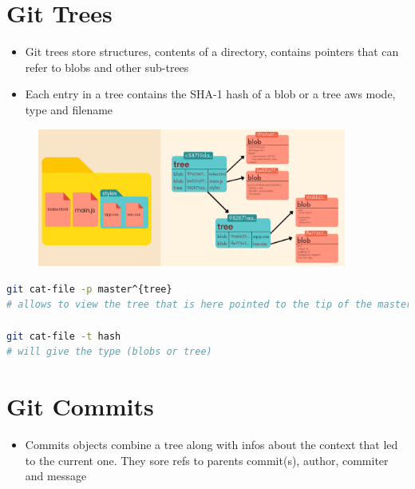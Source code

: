 \documentclass{report}
\begin{document}
\section{Git Trees}

\begin{itemize}
	\item Git trees store structures, contents of a directory, contains pointers that can refer to blobs and other sub-trees 
	\item Each entry in a tree contains the SHA-1 hash of a blob or a tree aws mode, type and filename
\end{itemize}

\begin{figure}[H] 
	 \centering 
	 \includegraphics[width=4in]{screenshots/2022-07-10T17-18-43Z.png} 
\end{figure}

\begin{tcolorbox}[title=Viewing Trees,colback=backcolour]
\begin{lstlisting}[language=bash]
git cat-file -p master^{tree} 
# allows to view the tree that is here pointed to the tip of the master branch

git cat-file -t hash
# will give the type (blobs or tree)
\end{lstlisting}
\end{tcolorbox}

\section{Git Commits}

\begin{itemize}
	\item Commits objects combine a tree along with infos about the context that led to the current one. They sore refs to parents commit(s), author, commiter and message
\end{itemize}
\end{document}
